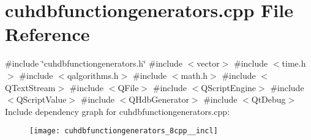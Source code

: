 \section{cuhdbfunctiongenerators.\+cpp File Reference}
\label{cuhdbfunctiongenerators_8cpp}
{\ttfamily \#include \char`\"{}cuhdbfunctiongenerators.\+h\char`\"{}}\newline
{\ttfamily \#include $<$vector$>$}\newline
{\ttfamily \#include $<$time.\+h$>$}\newline
{\ttfamily \#include $<$qalgorithms.\+h$>$}\newline
{\ttfamily \#include $<$math.\+h$>$}\newline
{\ttfamily \#include $<$Q\+Text\+Stream$>$}\newline
{\ttfamily \#include $<$Q\+File$>$}\newline
{\ttfamily \#include $<$Q\+Script\+Engine$>$}\newline
{\ttfamily \#include $<$Q\+Script\+Value$>$}\newline
{\ttfamily \#include $<$Q\+Hdb\+Generator$>$}\newline
{\ttfamily \#include $<$Qt\+Debug$>$}\newline
Include dependency graph for cuhdbfunctiongenerators.\+cpp\+:
\nopagebreak
\begin{figure}[H]
\begin{center}
\leavevmode
\texttt{[image: cuhdbfunctiongenerators\_8cpp\_\_incl]}
\end{center}
\end{figure}
